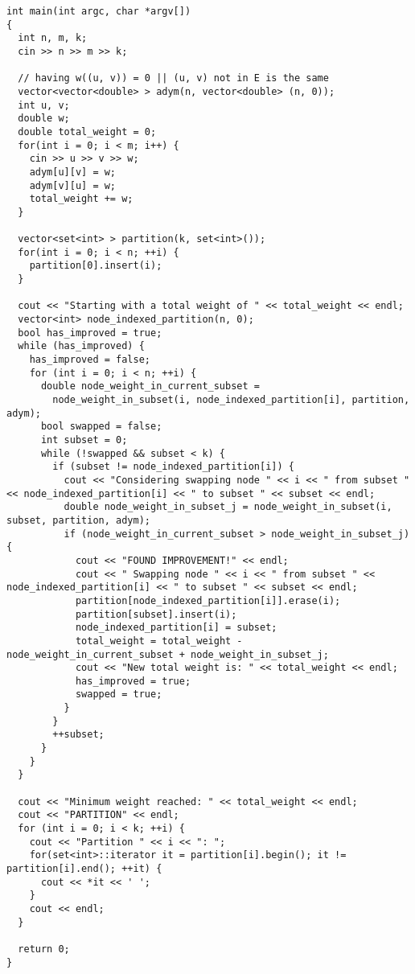\begin{lstlisting}[frame=single]
int main(int argc, char *argv[])
{
  int n, m, k;
  cin >> n >> m >> k;

  // having w((u, v)) = 0 || (u, v) not in E is the same 
  vector<vector<double> > adym(n, vector<double> (n, 0));
  int u, v;
  double w;
  double total_weight = 0;
  for(int i = 0; i < m; i++) {
    cin >> u >> v >> w;
    adym[u][v] = w;
    adym[v][u] = w;
    total_weight += w;
  }

  vector<set<int> > partition(k, set<int>());
  for(int i = 0; i < n; ++i) {
    partition[0].insert(i);
  }

  cout << "Starting with a total weight of " << total_weight << endl;
  vector<int> node_indexed_partition(n, 0);
  bool has_improved = true;
  while (has_improved) {
    has_improved = false;
    for (int i = 0; i < n; ++i) {
      double node_weight_in_current_subset = 
        node_weight_in_subset(i, node_indexed_partition[i], partition, adym);
      bool swapped = false;
      int subset = 0;
      while (!swapped && subset < k) {
        if (subset != node_indexed_partition[i]) {
          cout << "Considering swapping node " << i << " from subset " << node_indexed_partition[i] << " to subset " << subset << endl;
          double node_weight_in_subset_j = node_weight_in_subset(i, subset, partition, adym);
          if (node_weight_in_current_subset > node_weight_in_subset_j) {
            cout << "FOUND IMPROVEMENT!" << endl;
            cout << " Swapping node " << i << " from subset " << node_indexed_partition[i] << " to subset " << subset << endl;
            partition[node_indexed_partition[i]].erase(i);
            partition[subset].insert(i);
            node_indexed_partition[i] = subset;
            total_weight = total_weight - node_weight_in_current_subset + node_weight_in_subset_j;
            cout << "New total weight is: " << total_weight << endl;
            has_improved = true;
            swapped = true;
          }
        }
        ++subset;
      }
    }
  }

  cout << "Minimum weight reached: " << total_weight << endl;
  cout << "PARTITION" << endl;
  for (int i = 0; i < k; ++i) {
    cout << "Partition " << i << ": ";
    for(set<int>::iterator it = partition[i].begin(); it != partition[i].end(); ++it) {
      cout << *it << ' ';
    }
    cout << endl;
  }

  return 0;
}
\end{lstlisting}

